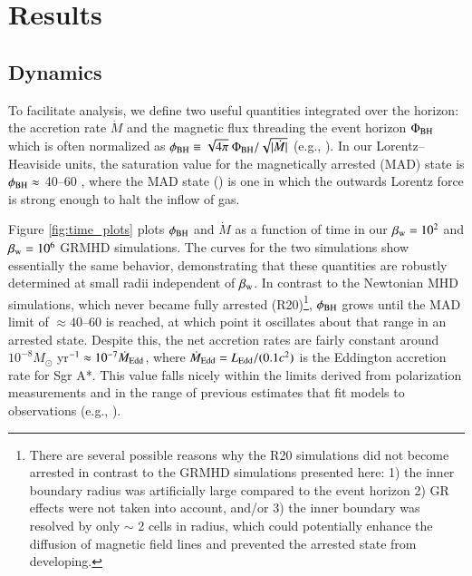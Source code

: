 \documentclass[twocolumn,twocolappendix,apjl,appendixfloats]{aastex63}
\begin{document}
\section{Results}

\subsection{Dynamics}

To facilitate analysis, we define two useful quantities integrated over the horizon: the accretion rate $\dot M$ and the magnetic flux threading the event horizon $\Phi_{\rm BH}$ which is often normalized as $\phi_{\rm BH} \equiv \sqrt{4{\rm \pi}} \textrm{ }\Phi_{\rm BH}/\sqrt{|\dot M|}$ (e.g., \citealt{Sasha2011}). In our Lorentz--Heaviside units, the saturation value for the magnetically arrested (MAD) state is $\phi_{\rm BH} \approx$ 40--60 \citep{Sasha2011,Narayan2012,White2019}, where the MAD state (\citealt{Narayan2003,Igumenshchev2003,Sasha2011}) is one in which the outwards Lorentz force is strong enough to halt the inflow of gas.  



Figure \ref{fig:time_plots} plots $\phi_{\rm BH}$ and $\dot M$ as a function of time in our $\beta_{\rm w} = 10^2$ and $\beta_{\rm w} = 10^6$ GRMHD simulations.  The curves for the two simulations show essentially the same behavior, demonstrating that these quantities are robustly determined at small radii independent of $\beta_{\rm w}$.  In contrast to the Newtonian MHD simulations, which never became fully arrested (R20)\footnote{There are several possible reasons why the R20 simulations did not become arrested in contrast to the GRMHD simulations presented here:  1) the inner boundary radius was artificially large compared to the event horizon 2) GR effects were not taken into account, and/or 3) the inner boundary was resolved by only $\sim$ 2 cells in radius, which could potentially enhance the diffusion of magnetic field lines and prevented the arrested state from developing.}, $\phi_{\rm BH}$ grows until the MAD limit of $\approx 40$--$60$ is reached, at which point it oscillates about that range in an arrested state.
Despite this, the net accretion rates are fairly constant around $10^{-8} M_\odot$ yr$^{-1} \approx 10^{-7} \dot M_{\rm Edd}$, where $\dot M_{\rm Edd} = L_{\rm Edd}/(0.1 c^2)$ is the Eddington accretion rate for Sgr A*.   This value falls nicely within the limits derived from polarization measurements \citep{Marrone2007} and in the range of previous estimates that fit models to observations (e.g., \citealt{Shcherbakov2010,Mosci2014,CK2015,Ressler2017,Dexter2020}).  
\end{document}
